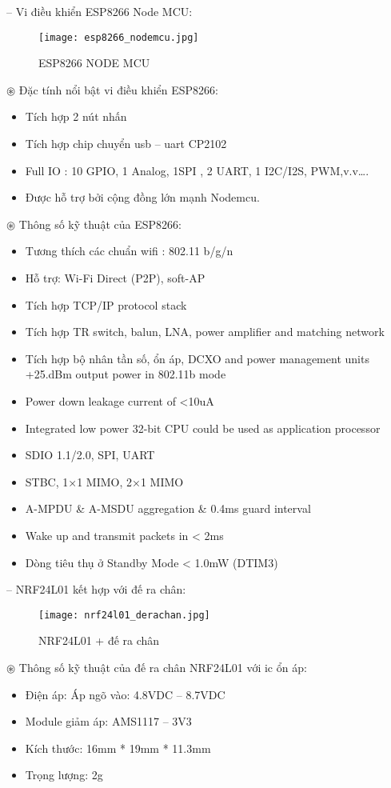 -- Vi điều khiển ESP8266 Node MCU:
\begin{figure}[H]
	\centering
	\texttt{[image: esp8266\_nodemcu.jpg]}
	\caption{ESP8266 NODE MCU}
\end{figure}

$\circledast$ Đặc tính nổi bật vi điều khiển ESP8266:
\begin{itemize}
	\item Tích hợp 2 nút nhấn
	\item Tích hợp chip chuyển usb – uart CP2102
	\item Full IO : 10 GPIO, 1 Analog, 1SPI , 2 UART, 1 I2C/I2S, PWM,v.v….
	\item Được hỗ trợ bởi cộng đồng lớn mạnh Nodemcu.
\end{itemize}

$\circledast$ Thông số kỹ thuật của ESP8266:
\begin{itemize}
	\item Tương thích các chuẩn wifi : 802.11 b/g/n
	\item Hỗ trợ: Wi-Fi Direct (P2P), soft-AP
	\item Tích hợp TCP/IP protocol stack
	\item Tích hợp TR switch, balun, LNA, power amplifier and matching network
	\item Tích hợp bộ nhân tần số, ổn áp, DCXO and power management units
	+25.dBm output power in 802.11b mode
	\item Power down leakage current of <10uA
	\item Integrated low power 32-bit CPU could be used as application processor
	\item SDIO 1.1/2.0, SPI, UART
	\item STBC, 1×1 MIMO, 2×1 MIMO
	\item A-MPDU \& A-MSDU aggregation \& 0.4ms guard interval
	\item Wake up and transmit packets in < 2ms
	\item Dòng tiêu thụ ở Standby Mode < 1.0mW (DTIM3)
\end{itemize}

-- NRF24L01 kết hợp với đế ra chân:
\begin{figure}[H]
	\centering
	\texttt{[image: nrf24l01\_derachan.jpg]}
	\caption{NRF24L01 + đế ra chân}
\end{figure}

$\circledast$ Thông số kỹ thuật của đế ra chân NRF24L01 với ic ổn áp:
\begin{itemize}
	\item Điện áp: Áp ngõ vào: 4.8VDC – 8.7VDC
	\item Module giảm áp: AMS1117 – 3V3
	\item Kích thước: 16mm * 19mm * 11.3mm
	\item Trọng lượng: 2g
\end{itemize}

